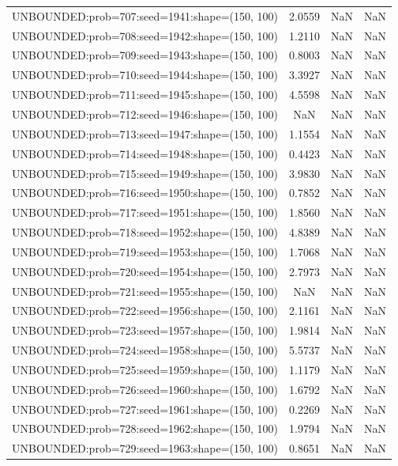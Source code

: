 \begin{longtable}{lccc}
UNBOUNDED:prob=707:seed=1941:shape=(150, 100) &  2.0559 &   NaN &    NaN \\
UNBOUNDED:prob=708:seed=1942:shape=(150, 100) &  1.2110 &   NaN &    NaN \\
UNBOUNDED:prob=709:seed=1943:shape=(150, 100) &  0.8003 &   NaN &    NaN \\
UNBOUNDED:prob=710:seed=1944:shape=(150, 100) &  3.3927 &   NaN &    NaN \\
UNBOUNDED:prob=711:seed=1945:shape=(150, 100) &  4.5598 &   NaN &    NaN \\
UNBOUNDED:prob=712:seed=1946:shape=(150, 100) &     NaN &   NaN &    NaN \\
UNBOUNDED:prob=713:seed=1947:shape=(150, 100) &  1.1554 &   NaN &    NaN \\
UNBOUNDED:prob=714:seed=1948:shape=(150, 100) &  0.4423 &   NaN &    NaN \\
UNBOUNDED:prob=715:seed=1949:shape=(150, 100) &  3.9830 &   NaN &    NaN \\
UNBOUNDED:prob=716:seed=1950:shape=(150, 100) &  0.7852 &   NaN &    NaN \\
UNBOUNDED:prob=717:seed=1951:shape=(150, 100) &  1.8560 &   NaN &    NaN \\
UNBOUNDED:prob=718:seed=1952:shape=(150, 100) &  4.8389 &   NaN &    NaN \\
UNBOUNDED:prob=719:seed=1953:shape=(150, 100) &  1.7068 &   NaN &    NaN \\
UNBOUNDED:prob=720:seed=1954:shape=(150, 100) &  2.7973 &   NaN &    NaN \\
UNBOUNDED:prob=721:seed=1955:shape=(150, 100) &     NaN &   NaN &    NaN \\
UNBOUNDED:prob=722:seed=1956:shape=(150, 100) &  2.1161 &   NaN &    NaN \\
UNBOUNDED:prob=723:seed=1957:shape=(150, 100) &  1.9814 &   NaN &    NaN \\
UNBOUNDED:prob=724:seed=1958:shape=(150, 100) &  5.5737 &   NaN &    NaN \\
UNBOUNDED:prob=725:seed=1959:shape=(150, 100) &  1.1179 &   NaN &    NaN \\
UNBOUNDED:prob=726:seed=1960:shape=(150, 100) &  1.6792 &   NaN &    NaN \\
UNBOUNDED:prob=727:seed=1961:shape=(150, 100) &  0.2269 &   NaN &    NaN \\
UNBOUNDED:prob=728:seed=1962:shape=(150, 100) &  1.9794 &   NaN &    NaN \\
UNBOUNDED:prob=729:seed=1963:shape=(150, 100) &  0.8651 &   NaN &    NaN \\

\end{longtable}
